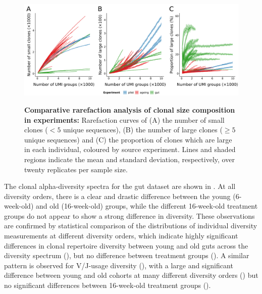\begin{figure}
\centering
\includegraphics[width = \textwidth]{_Figures/png/igseq-rarefied-clone-counts-size}
\begin{subfigure}{0em}
\label{fig:igseq-rarefied-clone-counts-small}
\end{subfigure}
\begin{subfigure}{0em}
\label{fig:igseq-rarefied-clone-counts-large}
\end{subfigure}
\begin{subfigure}{0em}
\label{fig:igseq-rarefied-clone-counts-large-pc}
\end{subfigure}
\caption[Comparative rarefaction analysis of clonal size composition in \igseq experiments]{\textbf{Comparative rarefaction analysis of clonal size composition in \igseq experiments:} Rarefaction curves of (A) the number of small clones ($<5$ unique sequences), (B) the number of large clones ($\geq 5$ unique sequences) and (C) the proportion of clones which are large in each individual, coloured by source experiment. Lines and shaded regions indicate the mean and standard deviation, respectively, over twenty replicates per sample size.}
\label{fig:igseq-rarefied-clone-counts-size}
\end{figure}

The clonal alpha-diversity spectra for the gut dataset are shown in . At all diversity orders, there is a clear and drastic difference between the young (6-week-old) and old (16-week-old) groups, while the different 16-week-old treatment groups do not appear to show a strong difference in diversity. These observations are confirmed by statistical comparison of the distributions of individual diversity measurements at different diversity orders, which indicate highly significant differences in clonal repertoire diversity between young and old guts across the diversity spectrum (), but no difference between treatment groups (). A similar pattern is observed for V/J-usage diversity (), with a large and significant difference between young and old cohorts at many different diversity orders () but no significant differences between 16-week-old treatment groups ().

